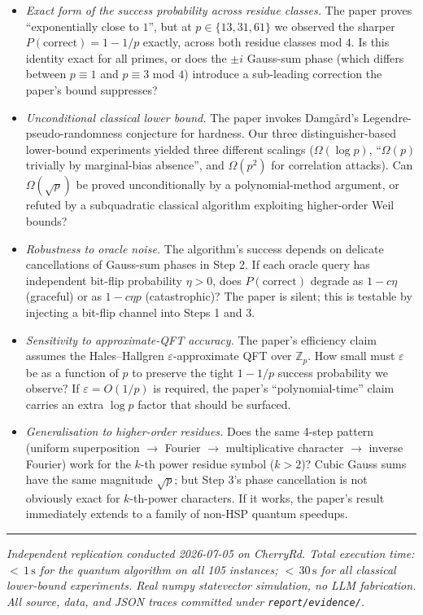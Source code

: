 \documentclass[11pt]{article}
\begin{document}
\begin{itemize}
  \item[\textbf{Q1}] \emph{Exact form of the success probability across
    residue classes.} The paper proves ``exponentially close to $1$'', but
    at $p\in\{13,31,61\}$ we observed the sharper $P(\text{correct})=1-1/p$
    exactly, across both residue classes mod $4$. Is this identity exact
    for all primes, or does the $\pm i$ Gauss-sum phase (which differs
    between $p\equiv 1$ and $p\equiv 3$ mod $4$) introduce a sub-leading
    correction the paper's bound suppresses?
  \item[\textbf{Q2}] \emph{Unconditional classical lower bound.} The paper
    invokes Damgård's Legendre-pseudo-randomness conjecture for
    hardness. Our three distinguisher-based lower-bound experiments
    yielded three different scalings ($\Omega(\log p)$,
    ``$\Omega(p)$ trivially by marginal-bias absence'', and
    $\Omega(p^2)$ for correlation attacks). Can $\Omega(\sqrt p)$ be
    proved unconditionally by a polynomial-method argument, or refuted
    by a subquadratic classical algorithm exploiting higher-order Weil
    bounds?
  \item[\textbf{Q3}] \emph{Robustness to oracle noise.} The algorithm's
    success depends on delicate cancellations of Gauss-sum phases in
    Step 2. If each oracle query has independent bit-flip probability
    $\eta > 0$, does $P(\text{correct})$ degrade as $1 - c\eta$
    (graceful) or as $1 - c\eta p$ (catastrophic)? The paper is silent;
    this is testable by injecting a bit-flip channel into Steps 1 and 3.
  \item[\textbf{Q4}] \emph{Sensitivity to approximate-QFT accuracy.}
    The paper's efficiency claim assumes the Hales--Hallgren
    $\varepsilon$-approximate QFT over $\mathbb{Z}_p$. How small must
    $\varepsilon$ be as a function of $p$ to preserve the tight
    $1-1/p$ success probability we observe? If $\varepsilon = O(1/p)$
    is required, the paper's ``polynomial-time'' claim carries an extra
    $\log p$ factor that should be surfaced.
  \item[\textbf{Q5}] \emph{Generalisation to higher-order residues.}
    Does the same 4-step pattern (uniform superposition $\to$ Fourier
    $\to$ multiplicative character $\to$ inverse Fourier) work for the
    $k$-th power residue symbol ($k > 2$)? Cubic Gauss sums have the
    same magnitude $\sqrt p$; but Step 3's phase cancellation is not
    obviously exact for $k$-th-power characters. If it works, the paper's
    result immediately extends to a family of non-HSP quantum speedups.
\end{itemize}

\vspace{0.5em}
\hrule
\vspace{0.4em}
\noindent\textit{Independent replication conducted 2026-07-05 on CherryRd.
Total execution time: ${<}\,1\,\mathrm{s}$ for the quantum algorithm on
all 105 instances; ${<}\,30\,\mathrm{s}$ for all classical lower-bound
experiments. Real numpy statevector simulation, no LLM fabrication.
All source, data, and JSON traces committed under \texttt{report/evidence/}.}
\end{document}
